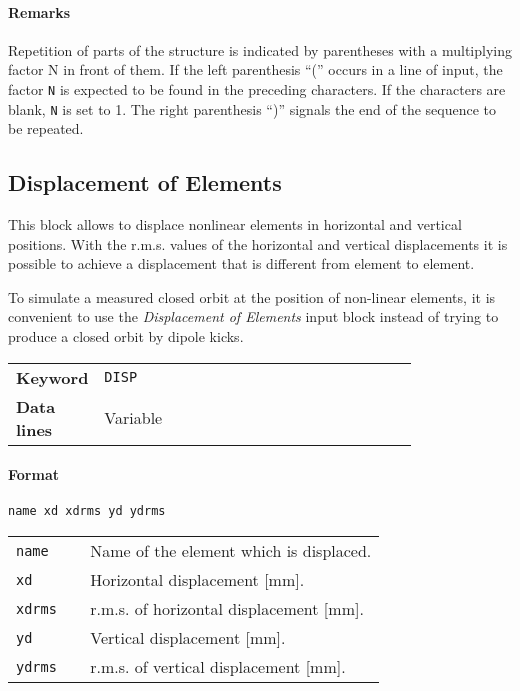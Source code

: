 \paragraph{Remarks}
Repetition of parts of the structure is indicated by parentheses with a multiplying factor N in front of them.
If the left parenthesis ``('' occurs in a line of input, the factor \texttt{N} is expected to be found in the preceding characters.
If the characters are blank, \texttt{N} is set to 1.
The right parenthesis ``)'' signals the end of the sequence to be repeated.

\subsection{Displacement of Elements} \label{DisEle}

This block allows to displace nonlinear elements in horizontal and vertical positions.
With the r.m.s. values of the horizontal and vertical displacements it is possible to achieve a displacement that is different from element to element.

To simulate a measured closed orbit at the position of non-linear elements, it is convenient to use the \textit{Displacement of Elements} input block instead of trying to produce a closed orbit by dipole kicks.

\bigskip
\begin{tabular}{@{}lp{0.80\linewidth}}
    \textbf{Keyword} & \texttt{DISP} \\
    \textbf{Data lines} & Variable
\end{tabular}

\paragraph{Format} \texttt{name xd xdrms yd ydrms}

\bigskip
\begin{tabular}{@{}lp{0.80\linewidth}}
    \texttt{name}  & Name of the element which is displaced. \\
    \texttt{xd}    & Horizontal displacement [mm]. \\
    \texttt{xdrms} & r.m.s. of horizontal displacement [mm]. \\
    \texttt{yd}    & Vertical displacement [mm]. \\
    \texttt{ydrms} & r.m.s. of vertical displacement [mm].
\end{tabular}

